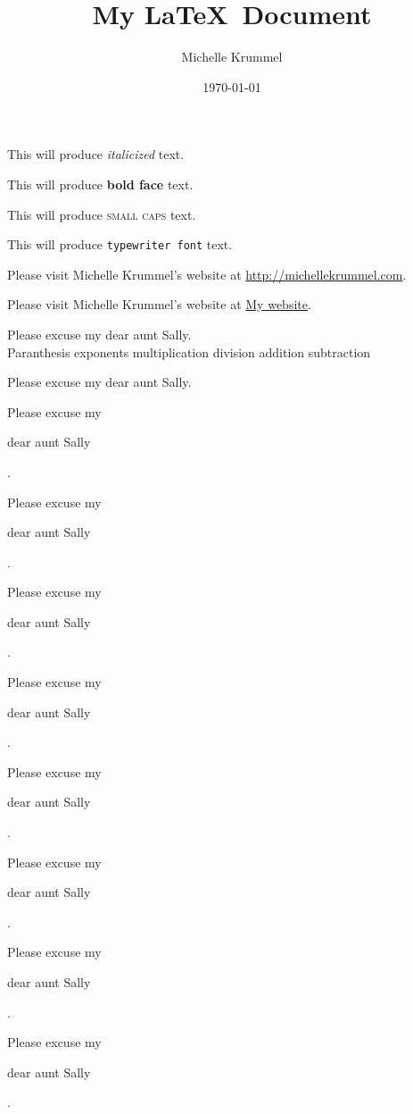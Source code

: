 \documentclass[11pt]{article}
\title{My \LaTeX\ Document}
\author{Michelle Krummel}
\date{\today}
\begin{document}
\tableofcontents
\maketitle

\vspace{1cm}
This will produce \textit{italicized} text.

This will produce \textbf{bold face} text.

This will produce \textsc{small caps} text.

This will produce \texttt{typewriter font} text.

Please visit Michelle Krummel's website at \url{http://michellekrummel.com}.

Please visit Michelle Krummel's website at \href{http://michellekrummel.com}{My website}.

Please excuse my dear aunt Sally.\\
Paranthesis exponents multiplication division addition subtraction

\vspace{1cm}

Please excuse my dear aunt Sally.

Please excuse my \begin{large}dear aunt Sally\end{large}.

Please excuse my \begin{Large}dear aunt Sally\end{Large}.

Please excuse my \begin{huge}dear aunt Sally\end{huge}.

Please excuse my \begin{Huge}dear aunt Sally\end{Huge}.

Please excuse my \begin{normalsize}dear aunt Sally\end{normalsize}.

Please excuse my \begin{small}dear aunt Sally\end{small}.

Please excuse my \begin{scriptsize}dear aunt Sally\end{scriptsize}.

Please excuse my \begin{tiny}dear aunt Sally\end{tiny}.
\end{document}
